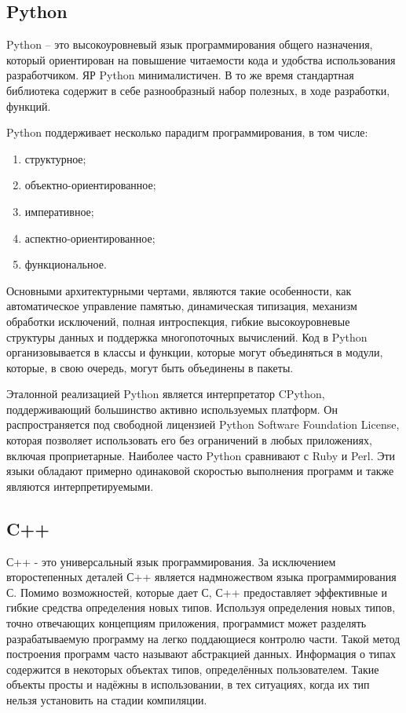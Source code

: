 \subsection{Python}
Python –  это высокоуровневый язык программирования общего назначения, который ориентирован на повышение читаемости кода и удобства использования разработчиком. 
ЯР Python минималистичен. 
В то же время стандартная библиотека содержит в себе разнообразный набор полезных, в ходе разработки, функций.

Python поддерживает несколько парадигм программирования, в том числе:
\begin{enumerate}
	\item структурное;
	\item объектно-ориентированное;
	\item императивное;
	\item аспектно-ориентированное;
	\item функциональное.
\end{enumerate}
Основными архитектурными чертами, являются такие особенности, как автоматическое управление памятью, динамическая типизация, механизм обработки исключений, полная интроспекция, гибкие высокоуровневые структуры данных и поддержка многопоточных вычислений. 
Код в Python организовывается в классы и функции, которые могут объединяться в модули, которые, в свою очередь, могут быть объединены в пакеты. 

Эталонной реализацией Python является интерпретатор CPython, поддерживающий большинство активно используемых платформ. Он распространяется под свободной лицензией Python Software Foundation License, которая
позволяет использовать его без ограничений в любых приложениях, включая проприетарные. 
Наиболее часто Python сравнивают с Ruby и Perl. Эти языки обладают примерно одинаковой скоростью выполнения программ и также являются интерпретируемыми.

\subsection{C++}
С++ - это универсальный язык программирования. 
За исключением второстепенных деталей С++ является надмножеством языка программирования С. 
Помимо возможностей, которые дает С, С++ предоставляет эффективные и гибкие средства определения новых типов. Используя определения новых типов, точно отвечающих концепциям приложения, программист может разделять разрабатываемую программу на легко поддающиеся контролю части. 
Такой метод построения программ часто называют абстракцией данных.
Информация о типах содержится в некоторых объектах типов, определённых пользователем. 
Такие объекты просты и надёжны в использовании, в тех ситуациях, когда их тип нельзя установить на стадии компиляции.

